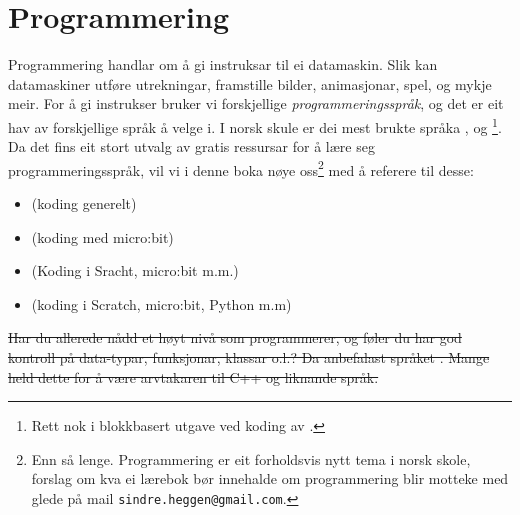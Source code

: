 



\section{Programmering}
Programmering handlar om å gi instruksar til ei datamaskin. Slik kan datamaskiner utføre utrekningar, framstille bilder, animasjonar, spel, og mykje meir. For å gi instrukser bruker vi forskjellige \textit{programmeringsspråk}, og det er eit hav av forskjellige språk å velge i. I norsk skule er dei mest brukte språka ,  og \footnote{Rett nok i blokkbasert utgave ved koding av .}. Da det fins eit stort utvalg av gratis ressursar for å lære seg programmeringsspråk, vil vi i denne boka nøye oss\footnote{Enn så lenge. Programmering er eit forholdsvis nytt tema i norsk skole, forslag om kva ei lærebok bør innehalde om programmering blir motteke med glede på mail {\tt{sindre.heggen@gmail.com}}.} med å referere til desse:
\begin{itemize}
	\item {} (koding generelt)
	\item {} (koding med micro:bit)
	\item {} (Koding i Sracht, micro:bit m.m.)
	\item {} (koding i Scratch, micro:bit, Python m.m)
\end{itemize} \vsk

\st{Har du allerede nådd et høyt nivå som programmerer, og føler du har god kontroll på data-typar, funksjonar, klassar o.l.? Da anbefalast språket . Mange held dette for å være arvtakaren til C++ og liknande språk.}



